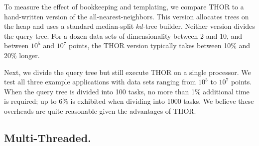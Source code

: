\documentclass[twoside,leqno,twocolumn]{article}
\newcommand{\authornote}[1]{(\footnote{Note to self: #1})}
\newcommand{\authorsnote}[1]{\authornote{#1}}
\newcommand{\fig}[1]{Figure~\ref{fig:#1}}
\newcommand{\mysub}[1]{\subsection{#1.}}
\begin{document}
To measure the effect of bookkeeping and templating, we compare THOR to a hand-written version of the all-nearest-neighbors.
This version allocates trees on the heap and uses a standard median-split $kd$-tree builder.
Neither version divides the query tree.
For a dozen data sets of dimensionality between 2 and 10, and between $10^5$ and $10^7$ points, the THOR version typically takes between 10\% and 20\% longer.

Next, we divide the query tree but still execute THOR on a single processor.
We test all three example applications with data sets ranging from $10^5$ to $10^7$ points.
When the query tree is divided into 100 tasks, no more than 1\% additional time is required; up to 6\% is exhibited when dividing into 1000 tasks.
We believe these overheads are quite reasonable given the advantages of THOR.



\mysub{Multi-Threaded}
\end{document}

